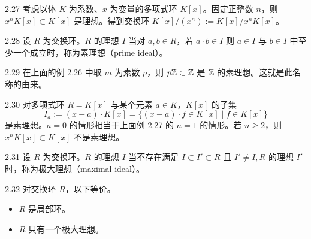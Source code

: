 
\begin{example}{2.27} 考虑以体 $K$ 为系数、$x$ 为变量的多项式环 $K[x]$。固定正整数 $n$，则 $x^nK[x]\subset K[x]$ 是理想。得到交换环 $K[x]/(x^n):=K[x]/x^nK[x]$。\end{example}

\begin{definition}{2.28} 设 $R$ 为交换环。$R$ 的理想 $I$ 当对 $a,b\in R$，若 $a\cdot b\in I$ 则 $a\in I$ 与 $b\in I$ 中至少一个成立时，称为素理想（prime ideal）。\end{definition}

\begin{example}{2.29} 在上面的例 2.26 中取 $m$ 为素数 $p$，则 $p\mathbb{Z}\subset\mathbb{Z}$ 是 $\mathbb{Z}$ 的素理想。这就是此名称的由来。\end{example}

\begin{example}{2.30} 对多项式环 $R=K[x]$ 与某个元素 $a\in K$，$K[x]$ 的子集
\[
  I_a := (x-a)\cdot K[x] = \{(x-a)\cdot f\in K[x] \mid f\in K[x]\}
\]
是素理想。$a=0$ 的情形相当于上面例 2.27 的 $n=1$ 的情形。若 $n\ge2$，则 $x^nK[x]\subset K[x]$ 不是素理想。\end{example}


\begin{definition}{2.31} 设 $R$ 为交换环。$R$ 的理想 $I$ 当不存在满足 $I\subset I'\subset R$ 且 $I'\neq I,R$ 的理想 $I'$ 时，称为极大理想（maximal ideal）。\end{definition}

\begin{lemma}{2.32} 对交换环 $R$，以下等价。
\begin{itemize}
  \item $R$ 是局部环。
  \item $R$ 只有一个极大理想。
\end{itemize}
\end{lemma}

